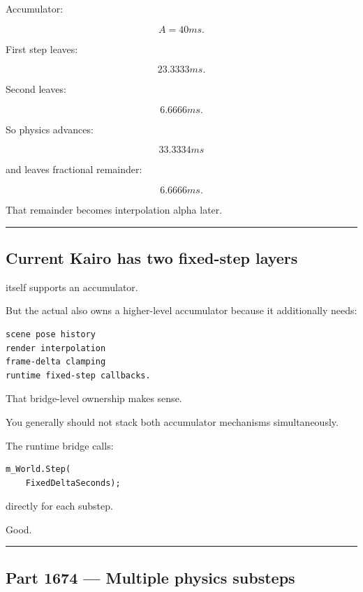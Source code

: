 Accumulator:

\[
A=40ms.
\]

First step leaves:

\[
23.3333ms.
\]

Second leaves:

\[
6.6666ms.
\]

So physics advances:

\[
33.3334ms
\]

and leaves fractional remainder:

\[
6.6666ms.
\]

That remainder becomes interpolation alpha later.

\begin{center}\rule{0.5\linewidth}{0.5pt}\end{center}

\subsection{Current Kairo has two fixed-step layers}\label{06-engine-ii-ch037-current-kairo-has-two-fixed-step-layers}

\hypertarget{06-engine-ii-ch037-current-kairo-has-two-fixed-step-layers}{}

 itself supports an accumulator.

But the actual  also owns a higher-level accumulator because it additionally needs:

\begin{verbatim}
scene pose history
render interpolation
frame-delta clamping
runtime fixed-step callbacks.
\end{verbatim}

That bridge-level ownership makes sense.

You generally should not stack both accumulator mechanisms simultaneously.

The runtime bridge calls:

\begin{verbatim}
m_World.Step(
    FixedDeltaSeconds);
\end{verbatim}

directly for each substep.

Good.

\begin{center}\rule{0.5\linewidth}{0.5pt}\end{center}

\subsection{Part 1674 --- Multiple physics substeps}\label{06-engine-ii-ch037-part-1674-multiple-physics-substeps}

